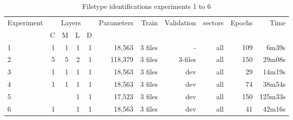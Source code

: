 \begin{table}[!ht]
    \centering
    \caption{Filetype identifications experiments 1 to 6}
    \label{tab:carving1-6}
\begin{tabular}{|l|r|r|r|r|r|r|r|r|r|r|}
\hline
Experiment & \multicolumn{4}{c|}{Layers}                                                                       & Parameters            & Train                 & Validation            & sectors               & Epochs & Time    \\ \cline{2-5}
     & \multicolumn{1}{l|}{C} & \multicolumn{1}{l|}{M} & \multicolumn{1}{l|}{L} & \multicolumn{1}{l|}{D} & \multicolumn{1}{l|}{} & \multicolumn{1}{l|}{} & \multicolumn{1}{l|}{} & \multicolumn{1}{l|}{} &        &         \\ \hline
1    & 1                      & 1                      & 1                      & 1                      & 18,563                & 3 files               & -                     & all                   & 109    & 6m39s   \\ \hline
2    & 5                      & 5                      & 2                      & 1                      & 118,379               & 3 files               & 3-files               & all                   & 150    & 29m08s  \\ \hline
3    & 1                      & 1                      & 1                      & 1                      & 18,563                & 3 files               & dev                   & all                   & 29     & 14m19s  \\ \hline
4    & 1                      & 1                      & 1                      & 1                      & 18,563                & 3 files               & dev                   & all                   & 74     & 38m54s  \\ \hline
5    &                        &                        & 1                      & 1                      & 17,523                & 3 files               & dev                   & all                   & 150    & 125m33s \\ \hline
6    & 1                      &                        & 1                      & 1                      & 18,563                & 3 files               & dev                   & all                   & 41     & 42m16s  \\ \hline
\end{tabular}
\end{table}
